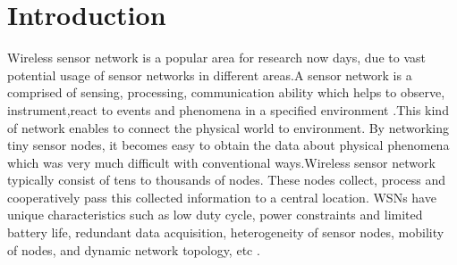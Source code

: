 \section{Introduction}
	Wireless sensor network \cite{wsn} is a popular area for research now days, due to vast potential usage of sensor networks in different areas.A sensor network is a comprised of sensing, processing, communication ability which helps to observe, instrument,react to events and phenomena in a specified environment \cite{wsn2} \cite{wsn3}.This kind of network  enables  to  connect  the  physical  world  to  environment.   By  networking
	tiny sensor nodes, it becomes easy to obtain the data about physical phenomena which was very much difficult with conventional ways.Wireless sensor network typically consist of tens to thousands of nodes. These nodes collect, process and cooperatively  pass  this  collected  information  to  a  central  location.   WSNs  have unique characteristics such as low duty cycle, power constraints and limited battery  life,  redundant  data acquisition,  heterogeneity  of  sensor  nodes,  mobility  of nodes,  and  dynamic  network  topology,  etc  \cite{wsn2}. 
